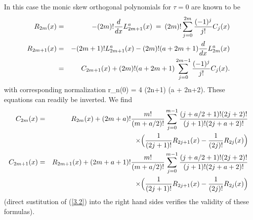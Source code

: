 In this case the monic skew orthogonal polynomials for $\tau = 0$ are known to 
be \cite{NW91}
\begin{eqnarray}
\label{3.2}
R_{2m}(x) & = & - (2m)! {d \over dx} L_{2m+1}^a (x) \: = \: (2m)!
\sum_{j=0}^{2m} {(-1)^j \over j!} C_j(x)  \nonumber \\
R_{2m+1}(x) & = & - (2m+1)!  L_{2m+1}^a (x)- (2m)! (a + 2m +1)
{d \over dx} L_{2m}^a(x) \nonumber \\
& = & C_{2m+1}(x) + (2m)!(a+2m+1) \sum_{j=0}^{2m-1}
{(-1)^j \over j!} C_j(x).
\end{eqnarray}
with corresponding normalization 
\beqa
\label{3.3}
r_n(0) = 4 \Gamma(2n+1) \Gamma(a + 2n+2).
\eeqa
These equations can readily be inverted. We find 
\begin{eqnarray}
\label{3.4}
C_{2m}(x) & = & R_{2m}(x) + (2m+a)! {m! \over (m+ a/2)!}
\sum_{j=0}^{m-1} {(j+a/2 + 1)! (2j + 2)! \over (j+1)! (2j+a+2)!} 
\nonumber \\
&& \times \Big ( {1 \over (2j+1)!} R_{2j+1}(x) -
{1 \over (2j)!} R_{2j}(x) \Big ) \nonumber \\
C_{2m+1}(x) & = & R_{2m+1}(x) + (2m+a+1)! {m! \over (m + a/2)!}
\sum_{j=0}^{m-1} {(j + a/2 + 1)! (2j + 2)! \over (j+1)! (2j + a + 2)!}
\nonumber \\
&& \times  \Big ( {1 \over (2j+1)!} R_{2j+1}(x) -
{1 \over (2j)!} R_{2j}(x) \Big )
\end{eqnarray}
(direct sustitution of (\ref{3.2}) 
into the right hand sides verifies the validity of 
these formulas). 

